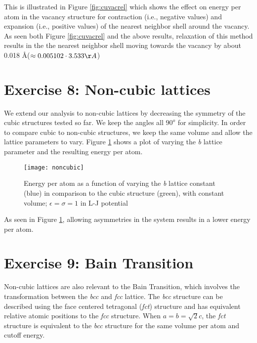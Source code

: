 \documentclass[12pt, oneside]{article}
\begin{document}
This is illustrated in Figure \ref{fig:cuvacrel} which shows the effect on energy per atom in the vacancy structure for contraction (i.e., negative values) and expansion (i.e., positive values) of the nearest neighbor shell around the vacancy. As seen both Figure \ref{fig:cuvacrel} and the above results, relaxation of this method results in the the nearest neighbor shell moving towards the vacancy by about 0.018 \AA  ($ \approx 0.005102 \cdot 3.533 \AA $)

\section{Exercise 8: Non-cubic lattices}

We extend our analysis to non-cubic lattices by decreasing the symmetry of the cubic structures tested so far. We keep the angles all $90^o$ for simplicity. In order to compare cubic to non-cubic structures, we keep the same volume and allow the lattice parameters to vary. Figure \ref{fig:noncubic} shows a plot of varying the \textit{b} lattice parameter and the resulting energy per atom.

\begin{figure}[htbp]
   \centering
   \texttt{[image: noncubic]} %
   \caption{Energy per atom as a function of varying the \textit{b} lattice constant (blue) in comparison to the cubic structure (green), with constant volume; $\epsilon = \sigma = 1$ in L-J potential}
   \label{fig:noncubic}
\end{figure}

 As seen in Figure \ref{fig:noncubic}, allowing asymmetries in the system results in a lower energy per atom.

\section{Exercise 9: Bain Transition}

Non-cubic lattices are also relevant to the Bain Transition, which involves the transformation between the \textit{bcc} and \textit{fcc} lattice. The \textit{bcc} structure can be described using the face centered tetragonal (\textit{fct}) structure and has equivalent relative atomic positions to the \textit{fcc} structure. When $a = b = \sqrt{2}c$, the \textit{fct} structure is equivalent to the \textit{bcc} structure for the same volume per atom and cutoff energy. 
\end{document}
